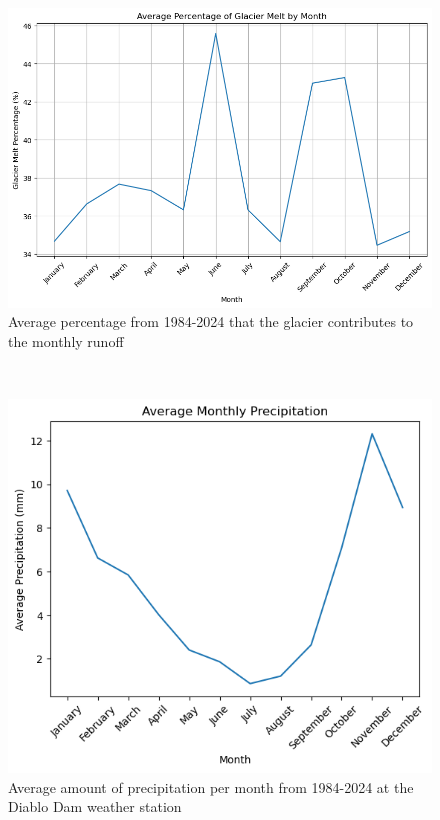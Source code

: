 \documentclass{article}
\begin{document}
\begin{figure}
    \centering
    \includegraphics[width=\textwidth]{Plots/percent_glac_melt_month.png}
    \caption{Average percentage from 1984-2024 that the glacier contributes to the monthly runoff}
    \label{fig:percent_glacier_runoff}
\end{figure}
\FloatBarrier\

\begin{figure}
    \centering
    \includegraphics[width=\textwidth]{Plots/monthly_precip.png}
    \caption{Average amount of precipitation per month from 1984-2024 at the Diablo Dam weather station}
    \label{fig:monthly_precip}
\end{figure}    
\FloatBarrier
\end{document}
